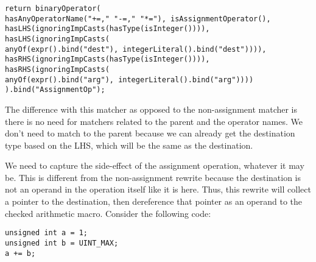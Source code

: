 \begin{center}
\parbox{0.9\linewidth}{
\texttt{return binaryOperator(\\
\hspace*{2em}hasAnyOperatorName("+=," "-=," "*="), isAssignmentOperator(),\\
\hspace*{2em}hasLHS(ignoringImpCasts(hasType(isInteger()))),\\
\hspace*{2em}hasLHS(ignoringImpCasts(\\
\hspace*{4em}anyOf(expr().bind("dest"), integerLiteral().bind("dest")))),\\
\hspace*{2em}hasRHS(ignoringImpCasts(hasType(isInteger()))),\\
\hspace*{2em}hasRHS(ignoringImpCasts(\\
\hspace*{4em}anyOf(expr().bind("arg"), integerLiteral().bind("arg"))))\\
).bind("AssignmentOp");}
}
\end{center}

The difference with this matcher as opposed to the non-assignment matcher is there is no need for matchers related to the parent and the operator names. We don't need to match to the parent because we can already get the destination type based on the LHS, which will be the same as the destination.

We need to capture the side-effect of the assignment operation, whatever it may be. This is different from the non-assignment rewrite because the destination is not an operand in the operation itself like it is here. Thus, this rewrite will collect a pointer to the destination, then dereference that pointer as an operand to the checked arithmetic macro. Consider the following code:

\begin{center}
\parbox{0.6\linewidth}{
\texttt{unsigned int a = 1;\\
unsigned int b = UINT\_MAX;\\
a += b;}
}
\end{center}


